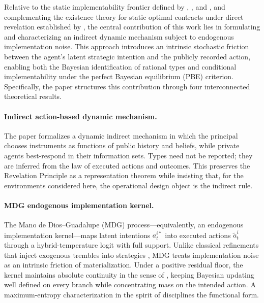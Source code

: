 \documentclass[review,authoryear,12pt]{elsarticle}
\theoremstyle{plain}
\theoremstyle{definition}
\newcommand{\1}{\mathbf{1}}
\begin{document}
Relative to the static implementability frontier defined by \citet{MyersonSatterthwaite1983}, \citet{Rochet1987}, and \citet{RochetChone1998}, and complementing the existence theory for static optimal contracts under direct revelation established by \citet{KadanRenySwinkels2017}, the central contribution of this work lies in formulating and characterizing an indirect dynamic mechanism subject to endogenous implementation noise. This approach introduces an intrinsic stochastic friction between the agent's latent strategic intention and the publicly recorded action, enabling both the Bayesian identification of rational types and conditional implementability under the perfect Bayesian equilibrium (PBE) criterion. Specifically, the paper structures this contribution through four interconnected theoretical results.

\paragraph{Indirect action-based dynamic mechanism.}
The paper formalizes a dynamic indirect mechanism in which the principal chooses instruments as functions of public history and beliefs, while private agents best-respond in their information sets. Types need not be reported; they are inferred from the law of executed actions and outcomes. This preserves the Revelation Principle as a representation theorem while insisting that, for the environments considered here, the operational design object is the indirect rule.

\paragraph{MDG endogenous implementation kernel.}
The Mano de Dios--Guadalupe (MDG) process---equivalently, an endogenous implementation kernel---maps latent intentions $a_t^{i\ast}$ into executed actions $\tilde a_t^i$ through a hybrid-temperature logit with full support. Unlike classical refinements that inject exogenous trembles into strategies \citep{Selten1975Perfectness,KrepsWilson1982}, MDG treats implementation noise as an intrinsic friction of materialization. Under a positive residual floor, the kernel maintains absolute continuity in the sense of \citet{KalaiLehrer1993}, keeping Bayesian updating well defined on every branch while concentrating mass on the intended action. A maximum-entropy characterization in the spirit of \citet{Jaynes1957Information} disciplines the functional form.
\end{document}
